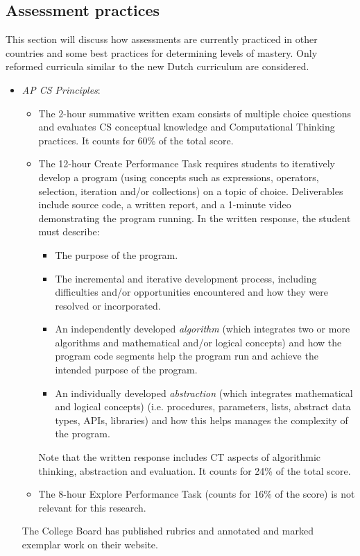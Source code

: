  





\subsection{Assessment practices}
This section will discuss how assessments are currently practiced in other countries and some best practices for determining levels of mastery. Only reformed curricula similar to the new Dutch curriculum are considered.



\begin{itemize}
\item \emph{AP CS Principles}:

    \begin{itemize}
    \item The 2-hour summative written exam consists of multiple choice questions and evaluates CS conceptual knowledge and Computational Thinking practices. It counts for 60\% of the total score.
    \item The 12-hour Create Performance Task requires students to iteratively develop a program (using concepts such as expressions, operators, selection, iteration and/or collections) on a topic of choice. Deliverables include source code, a written report, and a 1-minute video demonstrating the program running. In the written response, the student must describe:
         \begin{itemize}
         \item The purpose of the program.
         \item The incremental and iterative development process, including difficulties and/or opportunities encountered and how they were resolved or incorporated.
         \item An independently developed \emph{algorithm} (which integrates two or more algorithms and mathematical and/or logical concepts) and how the program code segments help the program run and achieve the intended purpose of the program.
         \item An individually developed \emph{abstraction} (which integrates mathematical and logical concepts) (i.e. procedures, parameters, lists, abstract data types, APIs, libraries) and how this helps manages the complexity of the program.
         \end{itemize}
         Note that the written response includes CT aspects of algorithmic thinking, abstraction and evaluation. It counts for 24\% of the total score.
    \item The 8-hour Explore Performance Task (counts for 16\% of the score) is not relevant for this research.
    \end{itemize}
    The College Board has published rubrics and annotated and marked exemplar work on their website.


\end{itemize}
